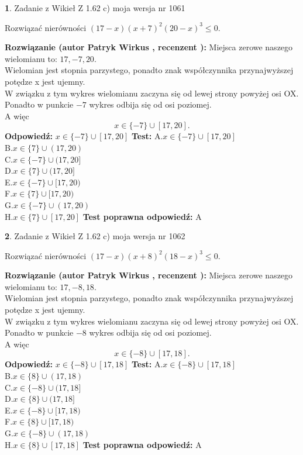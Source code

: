 \documentclass[12pt, a4paper]{article}
\theoremstyle{definition} %
\newtheorem{zad}{}
\newcommand{\zadStart}[1]{\begin{zad}#1\newline}
\newcommand{\zadStop}{\end{zad}}
\newcommand{\rozwStart}[2]{\noindent \textbf{Rozwiązanie (autor #1 , recenzent #2): }\newline}
\newcommand{\rozwStop}{\newline}
\newcommand{\odpStart}{\noindent \textbf{Odpowiedź:}\newline}
\newcommand{\odpStop}{\newline}
\newcommand{\testStart}{\noindent \textbf{Test:}\newline}
\newcommand{\testStop}{\newline}
\newcommand{\kluczStart}{\noindent \textbf{Test poprawna odpowiedź:}\newline}
\newcommand{\kluczStop}{\newline}
\begin{document}
\zadStart{Zadanie z Wikieł Z 1.62 c) moja wersja nr 1061}

Rozwiązać nierówności $(17-x)(x+7)^{2}(20-x)^{3}\le0$.
\zadStop
\rozwStart{Patryk Wirkus}{}
Miejsca zerowe naszego wielomianu to: $17, -7, 20$.\\
Wielomian jest stopnia parzystego, ponadto znak współczynnika przy\linebreak najwyższej potędze x jest ujemny.\\ W związku z tym wykres wielomianu zaczyna się od lewej strony powyżej osi OX.\\
Ponadto w punkcie $-7$ wykres odbija się od osi poziomej.\\
A więc $$x \in \{-7\} \cup [17,20].$$
\rozwStop
\odpStart
$x \in \{-7\} \cup [17,20]$
\odpStop
\testStart
A.$x \in \{-7\} \cup [17,20]$\\
B.$x \in \{7\} \cup (17,20)$\\
C.$x \in \{-7\} \cup (17,20]$\\
D.$x \in \{7\} \cup (17,20]$\\
E.$x \in \{-7\} \cup [17,20)$\\
F.$x \in \{7\} \cup [17,20)$\\
G.$x \in \{-7\} \cup (17,20)$\\
H.$x \in \{7\} \cup [17,20]$
\testStop
\kluczStart
A
\kluczStop



\zadStart{Zadanie z Wikieł Z 1.62 c) moja wersja nr 1062}

Rozwiązać nierówności $(17-x)(x+8)^{2}(18-x)^{3}\le0$.
\zadStop
\rozwStart{Patryk Wirkus}{}
Miejsca zerowe naszego wielomianu to: $17, -8, 18$.\\
Wielomian jest stopnia parzystego, ponadto znak współczynnika przy\linebreak najwyższej potędze x jest ujemny.\\ W związku z tym wykres wielomianu zaczyna się od lewej strony powyżej osi OX.\\
Ponadto w punkcie $-8$ wykres odbija się od osi poziomej.\\
A więc $$x \in \{-8\} \cup [17,18].$$
\rozwStop
\odpStart
$x \in \{-8\} \cup [17,18]$
\odpStop
\testStart
A.$x \in \{-8\} \cup [17,18]$\\
B.$x \in \{8\} \cup (17,18)$\\
C.$x \in \{-8\} \cup (17,18]$\\
D.$x \in \{8\} \cup (17,18]$\\
E.$x \in \{-8\} \cup [17,18)$\\
F.$x \in \{8\} \cup [17,18)$\\
G.$x \in \{-8\} \cup (17,18)$\\
H.$x \in \{8\} \cup [17,18]$
\testStop
\kluczStart
A
\kluczStop
\end{document}
